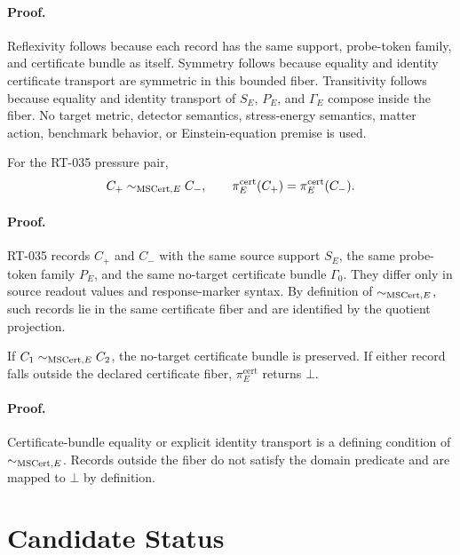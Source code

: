 \paragraph{Proof.}
Reflexivity follows because each record has the same support, probe-token
family, and certificate bundle as itself.  Symmetry follows because equality
and identity certificate transport are symmetric in this bounded fiber.
Transitivity follows because equality and identity transport of \(S_E\),
\(P_E\), and \(\Gamma_E\) compose inside the fiber.  No target metric,
detector semantics, stress-energy semantics, matter action, benchmark
behavior, or Einstein-equation premise is used.

\begin{proposition}
For the RT-035 pressure pair,
\[
  C_+ \mathrel{\sim_{\mathrm{MSCert},E}} C_-,
  \qquad
  \pi^{\mathrm{cert}}_E(C_+)=\pi^{\mathrm{cert}}_E(C_-).
\]
\end{proposition}

\paragraph{Proof.}
RT-035 records \(C_+\) and \(C_-\) with the same source support \(S_E\), the
same probe-token family \(P_E\), and the same no-target certificate bundle
\(\Gamma_0\).  They differ only in source readout values and response-marker
syntax.  By definition of \(\sim_{\mathrm{MSCert},E}\), such records lie in the same
certificate fiber and are identified by the quotient projection.

\begin{proposition}
If \(C_1\mathrel{\sim_{\mathrm{MSCert},E}}C_2\), the no-target certificate bundle is
preserved.  If either record falls outside the declared certificate fiber,
\(\pi^{\mathrm{cert}}_E\) returns \(\bot\).
\end{proposition}

\paragraph{Proof.}
Certificate-bundle equality or explicit identity transport is a defining
condition of \(\sim_{\mathrm{MSCert},E}\).  Records outside the fiber do not satisfy the
domain predicate and are mapped to \(\bot\) by definition.

\section{Candidate Status}

